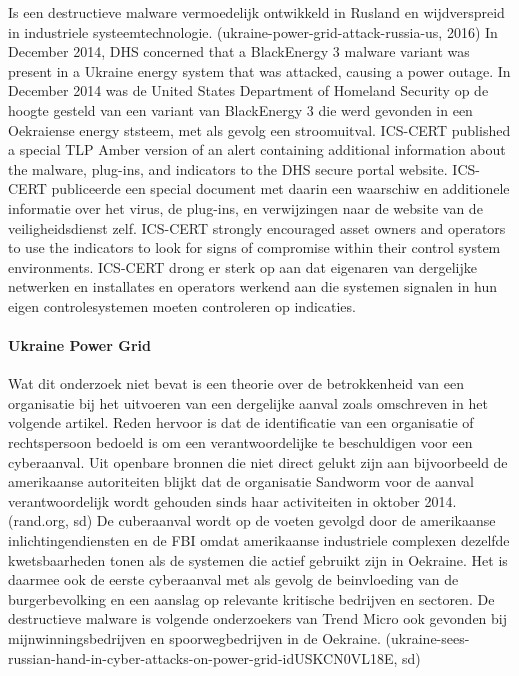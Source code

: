 Is een destructieve malware vermoedelijk ontwikkeld in Rusland en wijdverspreid in industriele
systeemtechnologie. (ukraine-power-grid-attack-russia-us, 2016)
In December 2014, DHS concerned that a BlackEnergy 3 malware variant was present in a
Ukraine energy system that was attacked, causing a power outage. In December 2014 was
de United States Department of Homeland Security op de hoogte gesteld van een variant
van BlackEnergy 3 die werd gevonden in een Oekraiense energy ststeem, met als gevolg
een stroomuitval.
ICS-CERT published a special TLP Amber version of an alert containing additional
information about the malware, plug-ins, and indicators to the DHS secure portal website.
ICS-CERT publiceerde een special document met daarin een waarschiw en additionele
informatie over het virus, de plug-ins, en verwijzingen naar de website van de
veiligheidsdienst zelf.
ICS-CERT strongly encouraged asset owners and operators to use the indicators to look for
signs of compromise within their control system environments. ICS-CERT drong er sterk op
aan dat eigenaren van dergelijke netwerken en installates en operators werkend aan die
systemen signalen in hun eigen controlesystemen moeten controleren op indicaties.

\paragraph{Ukraine Power Grid}

Wat dit onderzoek niet bevat is een theorie over de betrokkenheid van een organisatie bij het
uitvoeren van een dergelijke aanval zoals omschreven in het volgende artikel. Reden hervoor is dat
de identificatie van een organisatie of rechtspersoon bedoeld is om een verantwoordelijke te
beschuldigen voor een cyberaanval. Uit openbare bronnen die niet direct gelukt zijn aan bijvoorbeeld
de amerikaanse autoriteiten blijkt dat de organisatie Sandworm voor de aanval verantwoordelijk
wordt gehouden sinds haar activiteiten in oktober 2014.
(rand.org, sd)
De cuberaanval wordt op de voeten gevolgd door de amerikaanse inlichtingendiensten en de FBI
omdat amerikaanse industriele complexen dezelfde kwetsbaarheden tonen als de systemen die
actief gebruikt zijn in Oekraine. Het is daarmee ook de eerste cyberaanval met als gevolg de
beinvloeding van de burgerbevolking en een aanslag op relevante kritische bedrijven en sectoren. De
destructieve malware is volgende onderzoekers van Trend Micro ook gevonden bij
mijnwinningsbedrijven en spoorwegbedrijven in de Oekraine.
(ukraine-sees-russian-hand-in-cyber-attacks-on-power-grid-idUSKCN0VL18E, sd)
